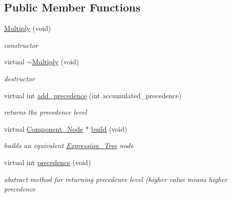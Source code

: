 \subsection*{Public Member Functions}
\begin{DoxyCompactItemize}
\item 
\hyperlink{classMadara_1_1Expression__Tree_1_1Multiply_a9ef54d8ea18849fc1d05d20ff82893ad}{Multiply} (void)
\begin{DoxyCompactList}\small\item\em constructor \item\end{DoxyCompactList}\item 
virtual \hyperlink{classMadara_1_1Expression__Tree_1_1Multiply_a43b946346c92ba8dce795e56ccc0bd4b}{$\sim$Multiply} (void)
\begin{DoxyCompactList}\small\item\em destructor \item\end{DoxyCompactList}\item 
virtual int \hyperlink{classMadara_1_1Expression__Tree_1_1Multiply_a53f26ed87bf2963a3e3187fb38e30c69}{add\_\-precedence} (int accumulated\_\-precedence)
\begin{DoxyCompactList}\small\item\em returns the precedence level \item\end{DoxyCompactList}\item 
virtual \hyperlink{classMadara_1_1Expression__Tree_1_1Component__Node}{Component\_\-Node} $\ast$ \hyperlink{classMadara_1_1Expression__Tree_1_1Multiply_a2b0402148e10449e7fcf5eeb512dcd31}{build} (void)
\begin{DoxyCompactList}\small\item\em builds an equivalent \hyperlink{classMadara_1_1Expression__Tree_1_1Expression__Tree}{Expression\_\-Tree} node \item\end{DoxyCompactList}\item 
virtual int \hyperlink{classMadara_1_1Expression__Tree_1_1Symbol_ac060dedb8d16864591b259df375109b3}{precedence} (void)
\begin{DoxyCompactList}\small\item\em abstract method for returning precedence level (higher value means higher precedence \item\end{DoxyCompactList}\end{DoxyCompactItemize}
